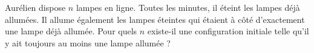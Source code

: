 Aurélien dispose $n$ lampes en ligne. Toutes les minutes, il éteint les lampes déjà allumées. Il allume également les lampes éteintes qui étaient à côté d'exactement une lampe déjà allumée. Pour quels $n$ existe-il une configuration initiale telle qu'il y ait toujours au moins une lampe allumée ?